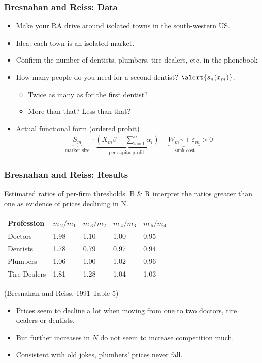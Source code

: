 \documentclass[aspectratio=169,11pt]{beamer}
\begin{document}
\begin{frame}
\frametitle{Bresnahan and Reiss: Data}
\begin{itemize}
\item Make your RA drive around isolated towns in the south-western US.
\item Idea: each town is an isolated market.
\item Confirm the number of dentists, plumbers, tire-dealers, etc. in the phonebook
\item How many people do you need for a second dentist? $\alert{s_n(x_m)}$.
\begin{itemize} 
\item Twice as many as for the first dentist?
\item More than that? Less than that?
\end{itemize}
\item Actual functional form (ordered probit)
\begin{eqnarray*}
\underbrace{S_m}_{\mbox{ market size } }\cdot \underbrace{\left(X_m \beta - \sum_{i=1}^n \alpha_i \right) }_{\mbox {per capita profit }} -\underbrace{ W_m \gamma + \varepsilon_m}_{\mbox { sunk cost}} > 0
\end{eqnarray*}

\end{itemize}
\end{frame}


\begin{frame}
\frametitle{Bresnahan and Reiss: Results}
Estimated ratios of per-firm thresholds. B \& R interpret the ratios greater
than one as evidence of prices declining in N.
\begin{center}
\begin{tabular}{|l|l|l|l|l|}
\hline
Profession & $m\,_{2}/m_{1}$ & $m\,_{3}/m_{2}$ & $m\,_{4}/m_{3}$ & $m\,_{5}/m_{4}$ \\ \hline
Doctors & 1.98 & 1.10 & 1.00 & 0.95 \\ \hline
Dentists & 1.78 & 0.79 & 0.97 & 0.94 \\ \hline
Plumbers & 1.06 & 1.00 & 1.02 & 0.96 \\ \hline
Tire Dealers & 1.81 & 1.28 & 1.04 & 1.03 \\ \hline
\end{tabular}
\end{center}
(Bresnahan and Reiss, 1991 Table 5\bigskip )
\begin{itemize}
\item Prices seem to decline a lot when moving from one to two doctors, tire
dealers or dentists.
\item But further increases in $N$ do not seem to increase competition much.
\item Consistent with old jokes, plumbers' prices never fall.
\end{itemize}
\end{frame}
\end{document}
